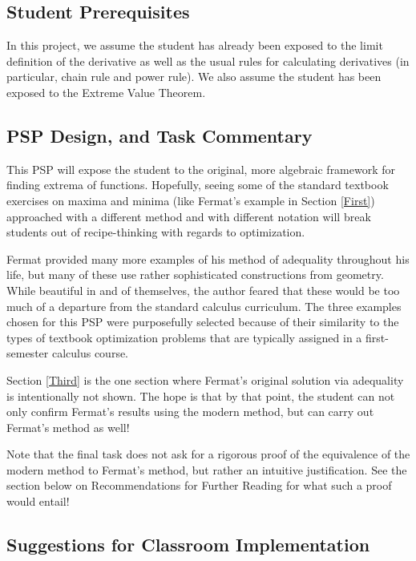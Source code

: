 \documentclass[11pt]{article}
\begin{document}
\subsection*{Student Prerequisites}

In this project, we assume the student has already been exposed to the limit definition of the derivative as well as the usual rules for calculating derivatives (in particular, chain rule and power rule).  We also assume the student has been exposed to the Extreme Value Theorem.

\subsection*{PSP Design, and Task Commentary}

This PSP will expose the student to the original, more algebraic framework for finding extrema of functions.  Hopefully, seeing some of the standard textbook exercises on maxima and minima (like Fermat's example in Section \ref{First}) approached with a different method and with different notation will break students out of recipe-thinking with regards to optimization.  

Fermat provided many more examples of his method of adequality throughout his life, but many of these use rather sophisticated constructions from geometry.  While beautiful in and of themselves, the author feared that these would be too much of a departure from the standard calculus curriculum.  The three examples chosen for this PSP were purposefully selected because of their similarity to the types of textbook optimization problems that are typically assigned in a first-semester calculus course.

Section \ref{Third} is the one section where Fermat's original solution via adequality is intentionally not shown.  The hope is that by that point, the student can not only confirm Fermat's results using the modern method, but can carry out Fermat's method as well!

Note that the final task does not ask for a rigorous proof of the equivalence of the modern method to Fermat's method, but rather an intuitive justification.  See the section below on Recommendations for Further Reading for what such a proof would entail!

\subsection*{Suggestions for Classroom Implementation}
\end{document}
